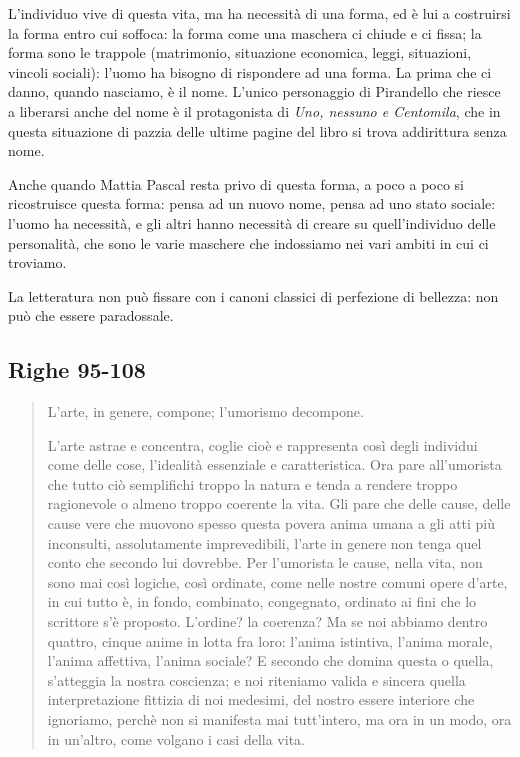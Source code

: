 \documentclass[a4paper, twoside, titlepage]{book}
\begin{document}
L'individuo vive di questa vita, ma ha necessità di una forma, ed è lui a costruirsi la forma entro cui soffoca: la forma come una maschera ci chiude e ci fissa; la forma sono le trappole (matrimonio, situazione economica, leggi, situazioni, vincoli sociali): l'uomo ha bisogno di rispondere ad una forma.
La prima che ci danno, quando nasciamo, è il nome. L'unico personaggio di Pirandello che riesce a liberarsi anche del nome è il protagonista di \textit{Uno, nessuno e Centomila}, che in questa situazione di pazzia delle ultime pagine del libro si trova addirittura senza nome.

Anche quando Mattia Pascal resta privo di questa forma, a poco a poco si ricostruisce questa forma: pensa ad un nuovo nome, pensa ad uno stato sociale: l'uomo ha necessità, e gli altri hanno necessità di creare su quell'individuo delle personalità, che sono le varie maschere che indossiamo nei vari ambiti in cui ci troviamo.

La letteratura non può fissare con i canoni classici di perfezione di bellezza: non può che essere paradossale.

\subsection*{Righe 95-108}

\begin{quotation}
L’arte, in genere, compone; l’umorismo decompone.

L’arte astrae e concentra, coglie cioè e rappresenta così degli individui come delle cose, l’idealità essenziale e caratteristica. Ora pare all’umorista che tutto ciò semplifichi troppo la natura e tenda a rendere troppo ragionevole o almeno troppo coerente la vita. Gli pare che delle cause, delle cause vere che muovono spesso questa povera anima umana a gli atti più inconsulti, assolutamente imprevedibili, l’arte in genere non tenga quel conto che secondo lui dovrebbe. Per l’umorista le cause, nella vita, non sono mai così logiche, così ordinate, come nelle nostre comuni opere d’arte, in cui tutto è, in fondo, combinato, congegnato, ordinato ai fini che lo scrittore s’è proposto. L’ordine? la coerenza? Ma se noi abbiamo dentro quattro, cinque anime in lotta fra loro: l’anima istintiva, l’anima morale, l’anima affettiva, l’anima sociale? E secondo che domina questa o quella, s’atteggia la nostra coscienza; e noi riteniamo valida e sincera quella interpretazione fittizia di noi medesimi, del nostro essere interiore che ignoriamo, perchè non si manifesta mai tutt’intero, ma ora in un modo, ora in un’altro, come volgano i casi della vita.
\end{quotation}
\end{document}

